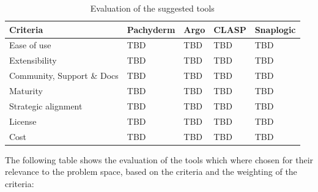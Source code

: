\begin{table}[htb]
    \centering
    \begin{tabular}{|l|l|l|l|l|} \hline
        \textbf{Criteria}                                          & \textbf{Pachyderm}    & \textbf{Argo}         & \textbf{\ac{CLASP}}   & \textbf{Snaplogic}     \\ \hline
        Ease of use                                                & TBD                   & TBD                   & TBD                   & TBD                    \\ \hline
        Extensibility                                              & TBD                   & TBD                   & TBD                   & TBD                    \\ \hline
        Community, Support \& Docs                                 & TBD                   & TBD                   & TBD                   & TBD                    \\ \hline
        Maturity                                                   & TBD                   & TBD                   & TBD                   & TBD                    \\ \hline
        Strategic alignment                                        & TBD                   & TBD                   & TBD                   & TBD                    \\ \hline
        License                                                    & TBD                   & TBD                   & TBD                   & TBD                    \\ \hline
        Cost                                                       & TBD                   & TBD                   & TBD                   & TBD                    \\ \hline

    \end{tabular}
    \caption{Evaluation of the suggested tools}
    \label{tab:evaluation_of_the_suggested_tools}
\end{table}

The following table shows the evaluation of the tools which where chosen for their relevance to the problem space, based on the criteria and the weighting of the criteria:

